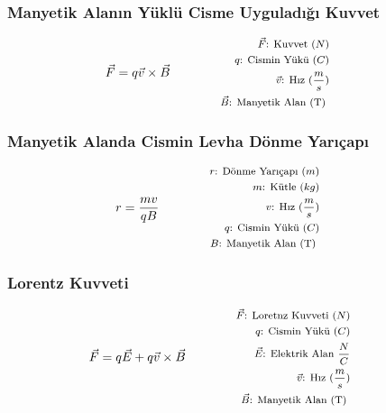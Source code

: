 \subsubsection*{Manyetik Alanın Yüklü Cisme Uyguladığı Kuvvet}
\begin{equation}
    \vec{F} = q \vec{v} \times \vec{B} \qquad \qquad \parbox{4cm}{\footnotesize$\begin{aligned}
        \vec{F}\text{: Kuvvet } (N) \\
        q\text{: Cismin Yükü } (C) \\
        \vec{v}\text{: Hız } (\frac{m}{s}) \\
        \vec{B}\text{: Manyetik Alan (T) }
\end{aligned}$}
\end{equation}

\subsubsection*{Manyetik Alanda Cismin Levha Dönme Yarıçapı}
\begin{equation}
    r = \frac{m v}{q B} \qquad \qquad \parbox{4cm}{\footnotesize$\begin{aligned}
        r\text{: Dönme Yarıçapı } (m) \\
        m\text{: Kütle } (kg) \\
        v\text{: Hız } (\frac{m}{s}) \\
        q\text{: Cismin Yükü } (C) \\
        B\text{: Manyetik Alan (T) }
\end{aligned}$}
\end{equation}

\subsubsection*{Lorentz Kuvveti}
\begin{equation}
    \vec{F} = q \vec{E} + q \vec{v} \times \vec{B} \qquad \qquad \parbox{4cm}{\footnotesize$\begin{aligned}
        \vec{F}\text{: Loretnz Kuvveti } (N) \\
        q\text{: Cismin Yükü } (C) \\
        \vec{E}\text{: Elektrik Alan } \frac{N}{C} \\
        \vec{v}\text{: Hız } (\frac{m}{s}) \\
        \vec{B}\text{: Manyetik Alan (T) }
\end{aligned}$}
\end{equation}
